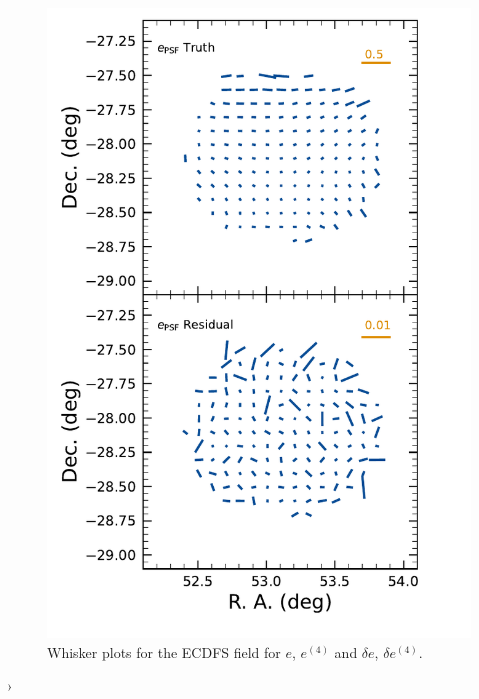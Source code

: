 \begin{figure}[htb!]
    \includegraphics[scale=0.33]{psf_second_whisker}
    \caption{Whisker plots for the  \gls{ECDFS} field for $e$, $e^{(4)}$ and $\delta e$, $\delta e^{(4)}$.}
    \label{fig:psf_residuals_whisker_ECDFS}
\end{figure}›

